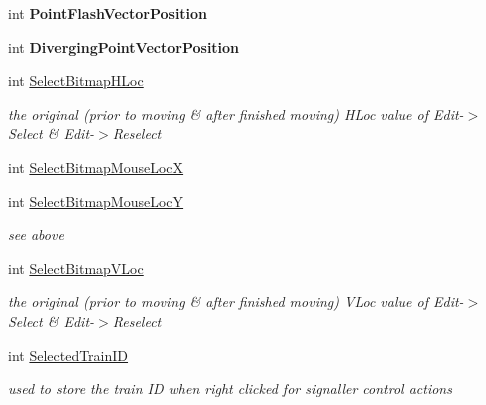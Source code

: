 \begin{DoxyCompactItemize}
int {\bfseries Point\+Flash\+Vector\+Position}
\item 
\mbox{\label{class_t_interface_a3ba3ac4978e08f567f4883f351013c36}} 
int {\bfseries Diverging\+Point\+Vector\+Position}
\item 
\mbox{\label{class_t_interface_a866932aa49ae00877e2f6f310aa9354b}} 
int \mbox{\hyperlink{class_t_interface_a866932aa49ae00877e2f6f310aa9354b}{Select\+Bitmap\+H\+Loc}}
\begin{DoxyCompactList}\small\item\em the original (prior to moving \& after finished moving) H\+Loc value of Edit-\/$>$Select \& Edit-\/$>$Reselect \end{DoxyCompactList}\item 
int \mbox{\hyperlink{class_t_interface_ae217ab17f77c5f5e6008cdd7d5059e5a}{Select\+Bitmap\+Mouse\+LocX}}
\item 
\mbox{\label{class_t_interface_a0ecaf98380c5adbbb90a8ee2d0b51149}} 
int \mbox{\hyperlink{class_t_interface_a0ecaf98380c5adbbb90a8ee2d0b51149}{Select\+Bitmap\+Mouse\+LocY}}
\begin{DoxyCompactList}\small\item\em see above \end{DoxyCompactList}\item 
\mbox{\label{class_t_interface_ac08eaf19ddd0ab9b43d54accca9da264}} 
int \mbox{\hyperlink{class_t_interface_ac08eaf19ddd0ab9b43d54accca9da264}{Select\+Bitmap\+V\+Loc}}
\begin{DoxyCompactList}\small\item\em the original (prior to moving \& after finished moving) V\+Loc value of Edit-\/$>$Select \& Edit-\/$>$Reselect \end{DoxyCompactList}\item 
\mbox{\label{class_t_interface_adbfa6e3d518a79685c87dbf0ac74b2ee}} 
int \mbox{\hyperlink{class_t_interface_adbfa6e3d518a79685c87dbf0ac74b2ee}{Selected\+Train\+ID}}
\begin{DoxyCompactList}\small\item\em used to store the train ID when right clicked for signaller control actions \end{DoxyCompactList}\item 

\end{DoxyCompactItemize}
